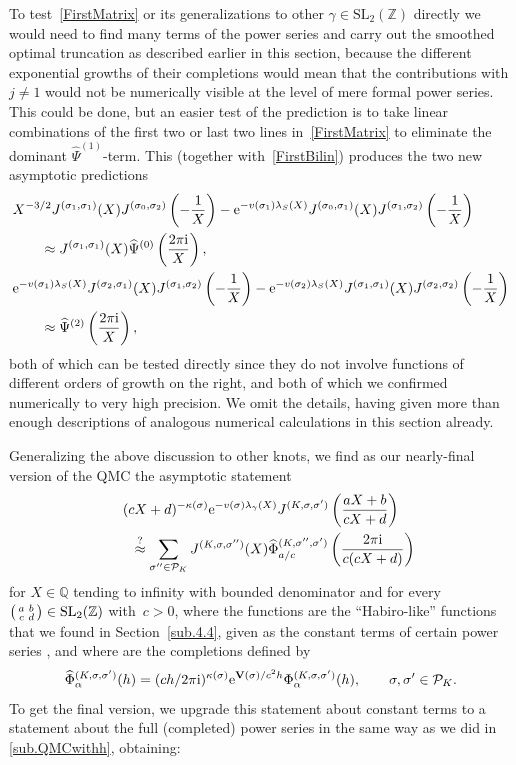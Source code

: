 \documentclass[pdftex]{sigma}
\numberwithin{equation}{section}
\def\calP{\mathcal P}
\def\calP{\mathcal P}
\def\l{\lambda}
\def\k{\kappa}
\def\SL{\mathrm{SL}}
\def\Phih{\widehat\Phi}
\def\Psih{\widehat\Psi}
\def\Psih{\widehat\Psi}
\def\a{\alpha}
\def\l{\lambda}
\def\Z{\mathbb Z}
\def\Q{\mathbb Q}
\def\m{ - }
\def\a{\alpha}
\def\l{\lambda}
\def\s{\sigma}
\def\sma#1#2#3#4{\bigl(\smallmatrix#1&#2\\#3&#4\endsmallmatrix\bigr)} %
\def\J{\mathbf J} \def\J{J} %
\def\Qbar{\overline{\Q}}
\def\V{\mathbf V}
\def\tV{v} %
\def\g{\gamma}
\begin{document}
To test~\eqref{FirstMatrix} or its generalizations to other $\g\in\SL_2(\Z)$
directly we would need to find many terms of the power series \smash{$\Psi_\a^{(j)}(h)$}
and carry out the smoothed optimal truncation as described earlier in this section,
because the different exponential growths of their completions would mean that the
contributions with $j\ne1$ would not be numerically visible at the level of mere
formal power series. This could be done, but an easier test of the prediction is to
take linear combinations of the first two or last two lines in~\eqref{FirstMatrix}
to eliminate the dominant $\Psih^{(1)}$-term. This (together with~\eqref{FirstBilin})
produces the two new asymptotic predictions
\begin{align*}
 &X^{-3/2} \J^{(\s_1,\s_1)}(X) \J^{(\s_0,\s_2)}\left(-\frac{1}{X}\right) \m
 {\rm e}^{-\tV(\s_1) \l_S(X)}\J^{(\s_0,\s_1)}(X)
 \J^{(\s_1,\s_2)}\left(-\frac{1}{X}\right)\\
 &\qquad\approx \J^{(\s_1,\s_1)}(X) \Psih^{(0)}\left(\frac{2\pi {\rm i}}{X}\right) , \\
 &{\rm e}^{-\tV(\s_1) \l_S(X)} \J^{(\s_2,\s_1)}(X) \J^{(\s_1,\s_2)}\left(-\frac{1}{X}\right)\m
 {\rm e}^{-\tV(\s_2) \l_S(X)} \J^{(\s_1,\s_1)}(X) \J^{(\s_2,\s_2)}\left(-\frac{1}{X}\right)\\
 &\qquad \approx \Psih^{(2)}\left(\frac{2\pi {\rm i}}{X}\right) ,
\end{align*}
both of which can be tested directly since they do not involve functions of
different orders of growth on the right, and both of which we confirmed numerically
to very high precision. We omit the details, having given more than enough
descriptions of analogous numerical calculations in this section already.

Generalizing the above discussion to other knots, we find as our nearly-final version
of the QMC the asymptotic statement
\begin{gather*}
(cX+d)^{-\k(\s)} {\rm e}^{-\tV(\s)\l_\g(X)}
\J^{(K,\s,\s')}\left(\frac{aX+b}{cX+d}\right)\\
\qquad \overset?\approx
\sum_{\s'' \in \calP_K}\J^{(K,\s,\s'')}(X)
\Phih^{(K,\s'',\s')}_{a/c}\left(\frac{2\pi {\rm i}}{c(cX+d)}\right)
\end{gather*}
for $X\in\Q$ tending to infinity with bounded denominator and for every
$\sma abcd\in\SL_2(\Z)$ with~${c>0}$, where the functions \smash{$\J^{(K,\s,\s')}$} are the
``Habiro-like'' functions that we found in Section~\ref{sub.4.4}, given
as the constant terms of certain power series \smash{$\Phi^{(K,\s,\s')}_\a(h)\in\Qbar[[h]]$},
and where \smash{$\Phih^{(K,\s,\s')}_\a(h)$} are the completions defined by
\[%
\Phih^{(K,\s,\s')}_\a(h) = (ch/2\pi {\rm i})^{\k(\s)} {\rm e}^{\V(\s)/c^2h}
\Phi^{(K,\s,\s')}_\a(h), \qquad \s,\s' \in \calP_K .
\]
To get the final version, we upgrade this statement about constant terms to a statement
about the full (completed) power series in the same way as we did in \ref{sub.QMCwithh},
obtaining:
\end{document}
